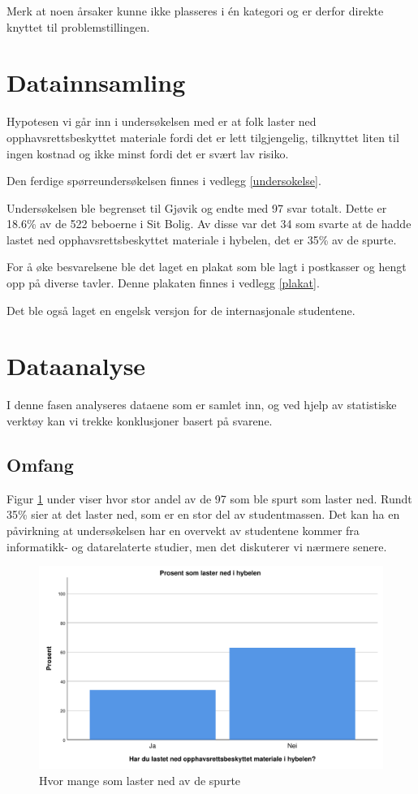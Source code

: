Merk at noen årsaker kunne ikke plasseres i én kategori og er derfor direkte knyttet til problemstillingen.


\section{Datainnsamling}
Hypotesen vi går inn i undersøkelsen med er at folk laster ned opphavsrettsbeskyttet materiale fordi det er lett tilgjengelig, tilknyttet liten til ingen kostnad og ikke minst fordi det er svært lav risiko. 

Den ferdige spørreundersøkelsen finnes i vedlegg \ref{undersokelse}. 

Undersøkelsen ble begrenset til Gjøvik og endte med 97 svar totalt. Dette er 18.6\% av de 522 beboerne i Sit Bolig. Av disse var det 34 som svarte at de hadde lastet ned opphavsrettsbeskyttet materiale i hybelen, det er 35\% av de spurte. 

For å øke besvarelsene ble det laget en plakat som ble lagt i postkasser og hengt opp på diverse tavler. Denne plakaten finnes i vedlegg \ref{plakat}.

Det ble også laget en engelsk versjon for de internasjonale studentene. 

\section{Dataanalyse}
I denne fasen analyseres dataene som er samlet inn, og ved hjelp av statistiske verktøy kan vi trekke konklusjoner basert på svarene. 

\subsection{Omfang}
Figur \ref{fig:case1-lasterned} under viser hvor stor andel av de 97 som ble spurt som laster ned. Rundt 35\% sier at det laster ned, som er en stor del av studentmassen. Det kan ha en påvirkning at undersøkelsen har en overvekt av studentene kommer fra informatikk- og datarelaterte studier, men det diskuterer vi nærmere senere. 

\begin{figure}[H]
    \centering
    \includegraphics[scale=0.45]{case_1/bilder/lasterned.pdf}
    \caption[Hvor mange som laster ned]{Hvor mange som laster ned av de spurte}
    \label{fig:case1-lasterned}
\end{figure}

